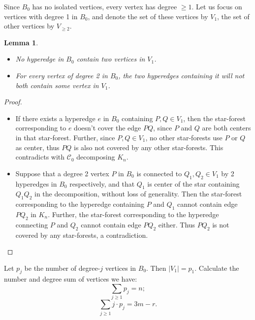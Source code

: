 \documentclass{article}
\newtheorem{lem}[thm]{Lemma}
\newcommand{\C}{\mathcal{C}}
\begin{document}
Since $B_0$ has no isolated vertices, every vertex has degree $\ge1$. Let us focus on vertices with degree 1 in $B_0$, and denote the set of these vertices by $V_1$, the set of other vertices by $V_{\ge 2}$.
\begin{lem}\label{Lem:3}
\begin{itemize}
    \item[(1)] No hyperedge in $B_0$ contain two vertices in $V_1$.
    \item[(2)] For every vertex of degree 2 in $B_0$, the two hyperedges containing it will not both contain some vertex in $V_1$.
\end{itemize}
\end{lem}
\begin{proof}
\begin{itemize}
    \item [(1)] If there exists a hyperedge $e$ in $B_0$ containing $P, Q\in V_1$, then the star-forest corresponding to $e$ doesn't cover the edge $PQ$, since $P$ and $Q$ are both centers in that star-forest. Further, since $P,Q\in V_1$, no other star-forests use $P$ or $Q$ as center, thus $PQ$ is also not covered by any other star-forests. This contradicts with $\C_0$ decomposing $K_n$.
    \item [(2)] Suppose that a degree 2 vertex $P$ in $ B_0$ is connected to $Q_1, Q_2\in V_1$ by 2 hyperedges in $B_0$ respectively, and that $Q_1$ is center of the star containing $Q_1Q_2$ in the decomposition, without loss of generality. Then the star-forest corresponding to the hyperedge containing $P$ and $Q_1$ cannot contain edge $PQ_2$ in $K_n$. Further, the star-forest corresponding to the hyperedge connecting $P$ and $Q_2$ cannot contain edge $PQ_2$ either. Thus $PQ_2$ is not covered by any star-forests, a contradiction.
\end{itemize}
\end{proof}
	
Let $p_j$ be the number of degree-$j$ vertices in $B_0$. Then $|V_1|=p_1$. Calculate the number and degree sum of vertices we have:
\begin{equation}\label{eq:3-1}
        \sum_{j\geqslant1}p_j=n;
\end{equation}
\begin{equation}\label{eq:3-2}
		\sum_{j\geqslant1}j\cdot p_j=3m-r.
\end{equation}
	
\end{document}
